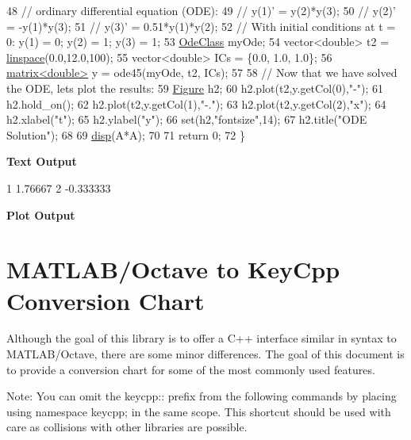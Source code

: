 \begin{DoxyCodeInclude}
48     \textcolor{comment}{// ordinary differential equation (ODE):}
49     \textcolor{comment}{// y(1)' = y(2)*y(3);}
50     \textcolor{comment}{// y(2)' = -y(1)*y(3);}
51     \textcolor{comment}{// y(3)' = 0.51*y(1)*y(2);}
52     \textcolor{comment}{// With initial conditions at t = 0: y(1) = 0; y(2) = 1; y(3) = 1;}
53     \hyperlink{class_ode_class}{OdeClass} myOde;
54     vector<double> t2 = \hyperlink{namespacekeycpp_a4e8769de1f22713d3564350d53125b26}{linspace}(0.0,12.0,100);
55     vector<double> ICs = \{0.0, 1.0, 1.0\};
56     \hyperlink{classkeycpp_1_1matrix}{matrix<double>} y = ode45(myOde, t2, ICs);
57     
58     \textcolor{comment}{// Now that we have solved the ODE, lets plot the results:}
59     \hyperlink{classkeycpp_1_1_figure}{Figure} h2;
60     h2.plot(t2,y.getCol(0),\textcolor{stringliteral}{"-"});
61     h2.hold\_on();
62     h2.plot(t2,y.getCol(1),\textcolor{stringliteral}{"-."});
63     h2.plot(t2,y.getCol(2),\textcolor{stringliteral}{"x"});
64     h2.xlabel(\textcolor{stringliteral}{"t"});
65     h2.ylabel(\textcolor{stringliteral}{"y"});
66     \textcolor{keyword}{set}(h2,\textcolor{stringliteral}{"fontsize"},14);
67     h2.title(\textcolor{stringliteral}{"ODE Solution"});
68     
69     \hyperlink{namespacekeycpp_a6a8a286886d48471685b18b7782f1e4a}{disp}(A*A);
70     
71     \textcolor{keywordflow}{return} 0;
72 \}
\end{DoxyCodeInclude}
 \par
 {\bfseries {\ttfamily Text} Output} 
\begin{DoxyCodeInclude}
1 1.76667
2 -0.333333
\end{DoxyCodeInclude}
 \par
 {\bfseries {\ttfamily Plot} Output}  \par
  \par


\section*{M\-A\-T\-L\-A\-B/\-Octave to Key\-Cpp Conversion Chart}

Although the goal of this library is to offer a C++ interface similar in syntax to M\-A\-T\-L\-A\-B/\-Octave, there are some minor differences. The goal of this document is to provide a conversion chart for some of the most commonly used features.

Note\-: You can omit the {\ttfamily keycpp\-:\-:} prefix from the following commands by placing {\ttfamily using namespace keycpp;} in the same scope. This shortcut should be used with care as collisions with other libraries are possible.

